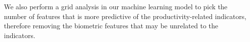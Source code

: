 We also perform a grid analysis in our machine learning model
to pick the number of features that is more predictive
of the productivity-related indicators, 
therefore removing the biometric
features that may be unrelated to the indicators.











